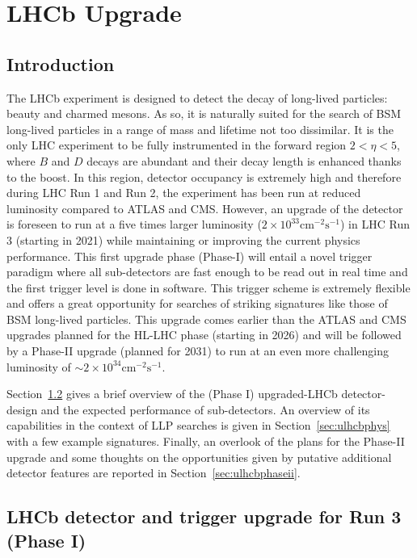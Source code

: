 \section{LHCb Upgrade}
\subsection{Introduction}

The LHCb experiment is designed to detect the decay of long-lived particles: beauty and charmed mesons. As so, it is naturally suited for the search of BSM long-lived particles in a range of mass and lifetime not too dissimilar. It is the only LHC experiment to be fully instrumented in the forward region $2<\eta<5$, where $B$ and $D$ decays are abundant and their decay length is enhanced thanks to the boost. In this region, detector occupancy is extremely high and therefore during LHC Run 1 and Run 2, the experiment has been run at reduced luminosity compared to ATLAS and CMS. However, an upgrade of the detector is foreseen to run at a five times larger luminosity ($2\times 10^{33}\text{cm}^{-2}\text{s}^{-1}$) in LHC Run 3 (starting in 2021) while maintaining or improving the current physics performance. This first upgrade phase (Phase-I) will entail a novel trigger paradigm where all sub-detectors are fast enough to be read out in real time and the first trigger level is done in software. This trigger scheme is  extremely flexible and offers a great opportunity for searches of striking signatures like those of BSM long-lived particles. This upgrade comes earlier than the ATLAS and CMS upgrades planned for the HL-LHC phase (starting in 2026) and will be followed by a Phase-II upgrade (planned for 2031) to run at an even more challenging luminosity of $\sim 2\times 10^{34}\text{cm}^{-2}\text{s}^{-1}$. 

Section~\ref{sec:ulhcbperf} gives a brief overview of the (Phase I) upgraded-LHCb detector-design and the expected performance of sub-detectors. 
An overview of its capabilities in the context of LLP searches is given in Section~\ref{sec:ulhcbphys} with a few example signatures. 
Finally, an overlook of the plans for the Phase-II upgrade and some thoughts on the opportunities given by putative additional detector features are reported in Section~\ref{sec:ulhcbphaseii}.



\subsection{LHCb detector and trigger upgrade for Run 3 (Phase I)}
\label{sec:ulhcbperf}


